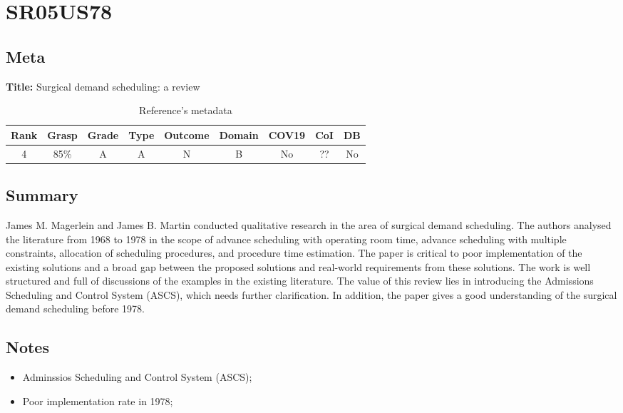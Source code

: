 \section{ SR05US78 }


\subsection{Meta}

    \textbf{Title:}
    Surgical demand scheduling: a review

    \begin{table}[H]
        \centering
        \begin{tabular}{|c|c|c|c|c|c|c|c|c|}
            \hline
                \textbf{Rank} & \textbf{Grasp} & \textbf{Grade} & \textbf{Type} & \textbf{Outcome} & \textbf{Domain} & \textbf{COV19} & \textbf{CoI} & \textbf{DB} \\
            \hline
                4 & 85\% & A & A & N & B & No & ?? & No \\
            \hline
        \end{tabular}
        \caption{Reference's metadata}
        \label{tab:SR05US78}
    \end{table}

\subsection{Summary}
    James M. Magerlein and James B. Martin \cite{x235} conducted qualitative research in the area of surgical demand scheduling. The authors analysed the literature from 1968 to 1978 in the scope of advance scheduling with operating room time, advance scheduling with multiple constraints, allocation of scheduling procedures, and procedure time estimation. The paper is critical to poor implementation of the existing solutions and a broad gap between the proposed solutions and real-world requirements from these solutions. The work is well structured and full of discussions of the examples in the existing literature. The value of this review lies in introducing the Admissions Scheduling and Control System (ASCS), which needs further clarification. In addition, the paper gives a good understanding of the surgical demand scheduling before 1978.

\subsection{Notes}
    \begin{itemize}
        \item Adminssios Scheduling and Control System (ASCS);
        \item Poor implementation rate in 1978;
    \end{itemize}


